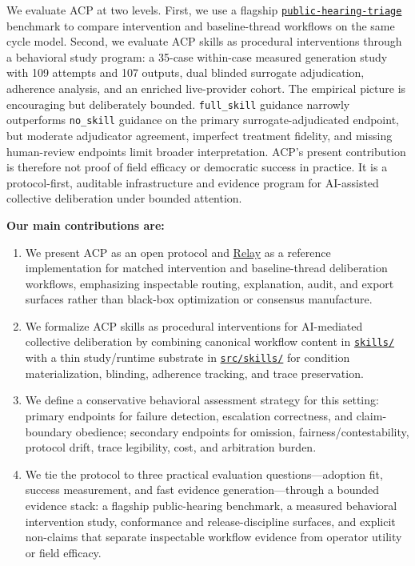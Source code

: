 \documentclass[11pt]{article}
\newcommand{\repobase}{https://github.com/davidkimai/acp}
\newcommand{\repodir}[2]{\href{\repobase/tree/main/#1}{\nolinkurl{#2}}}
\begin{document}
\vspace{0.1in}
We evaluate ACP at two levels. First, we use a flagship \href{https://github.com/davidkimai/acp/tree/main/benchmarks/scenarios/public-hearing-triage}{\texttt{public-hearing-triage}} benchmark to compare intervention and baseline-thread workflows on the same cycle model. Second, we evaluate ACP skills as procedural interventions through a behavioral study program: a 35-case within-case measured generation study with 109 attempts and 107 outputs, dual blinded surrogate adjudication, adherence analysis, and an enriched live-provider cohort. The empirical picture is encouraging but deliberately bounded. \texttt{full\_skill} guidance narrowly outperforms \texttt{no\_skill} guidance on the primary surrogate-adjudicated endpoint, but moderate adjudicator agreement, imperfect treatment fidelity, and missing human-review endpoints limit broader interpretation. ACP's present contribution is therefore not proof of field efficacy or democratic success in practice. It is a protocol-first, auditable infrastructure and evidence program for AI-assisted collective deliberation under bounded attention.

\vspace{0.1in}
\textbf{Our main contributions are:}

\begin{enumerate}[label=\arabic*.]
    \item We present ACP as an open protocol and \href{https://github.com/davidkimai/acp/blob/main/docs/specs/RELAY_REFERENCE_IMPLEMENTATION_SPEC.md}{Relay} as a reference implementation for matched intervention and baseline-thread deliberation workflows, emphasizing inspectable routing, explanation, audit, and export surfaces rather than black-box optimization or consensus manufacture.
    \item We formalize ACP skills as procedural interventions for AI-mediated collective deliberation by combining canonical workflow content in \repodir{skills}{skills/} with a thin study/runtime substrate in \repodir{src/skills}{src/skills/} for condition materialization, blinding, adherence tracking, and trace preservation.
    \item We define a conservative behavioral assessment strategy for this setting: primary endpoints for failure detection, escalation correctness, and claim-boundary obedience; secondary endpoints for omission, fairness/contestability, protocol drift, trace legibility, cost, and arbitration burden.
    \item We tie the protocol to three practical evaluation questions---adoption fit, success measurement, and fast evidence generation---through a bounded evidence stack: a flagship public-hearing benchmark, a measured behavioral intervention study, conformance and release-discipline surfaces, and explicit non-claims that separate inspectable workflow evidence from operator utility or field efficacy.
\end{enumerate}
\end{document}
